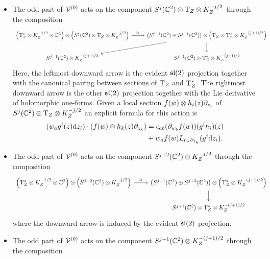 \begin{itemize}
\item The odd part of $\mathcal{V}^{(0)}$ acts on the component $S^{j}(\mathbb{C}^2) \otimes {\mathrm{T}}_Z \otimes K^{-j/2}_Z$ through the composition
\begin{equation}
\begin{tikzcd}
\left(\T^*_Z \otimes K^{-1/2}_Z \otimes \C^2\right) \otimes \left(S^{j}(\C^2) \otimes \T_Z \otimes K^{-j/2}_Z\right) \ar[r,"\cong"] & \left(S^{j-1}(\C^2) \oplus S^{j+1}(\C^2)\right) \otimes \left(\T_Z \otimes \T^*_Z \otimes K^{-(j+1)/2}_Z\right) \ar[dl] \ar[d] \\
S^{j-1}(\C^2) \otimes K^{-(j+1)/2}_Z & S^{j+1}(\C^2) \otimes \T^*_Z \otimes K^{-(j+1)/2}_Z 
\end{tikzcd}
\end{equation}
Here, the leftmost downward arrow is the evident $\mathfrak{sl}(2)$ projection together with the canonical pairing between sections of ${\mathrm{T}}_Z$ and ${\mathrm{T}}^*_Z$.
The rightmost downward arrow is the other $\mathfrak{sl}(2)$ projection together with the Lie derivative of holomorphic one-forms.  
Given a local section $f(w) \otimes h_i(z) \partial_{z_i}$ of $S^j(\mathbb{C}^2) \otimes {\mathrm{T}}_Z \otimes K_Z^{-j/2}$ an explicit formula for this action is
\begin{align*}
(w_a g^i(z) \mathrm{d} z_i) \cdot (f(w) \otimes h_k(z) \partial_{z_k}) & = \epsilon_{ab} (\partial_{w_b} f(w)) (g^i h_i)(z)  \\ & + w_a f(w) L_{h_k \partial_{z_k}} (g^i \mathrm{d} z_i) .
\end{align*}
\item The odd part of $\mathcal{V}^{(0)}$ acts on the component $S^{j+2}(\mathbb{C}^2) \otimes K^{-j/2}_Z$ through the composition
\begin{equation}
\begin{tikzcd}
\left(\T^*_Z \otimes K^{-1/2}_Z \otimes \C^2\right) \otimes \left(S^{j+2}(\C^2) \otimes K^{-j/2}_Z\right) \ar[r,"\cong"] & \left(S^{j+1}(\C^2) \oplus S^{j+3}(\C^2)\right) \otimes \left(\T^*_Z \otimes K^{-(j+1)/2}_Z\right) \ar[d] \\
& S^{j+1}(\C^2) \otimes \T^*_Z \otimes K^{-(j+1)/2}_Z
\end{tikzcd}
\end{equation}
where the downward arrow is induced by the evident $\mathfrak{sl}(2)$ projection.
\item The odd part of $\mathcal{V}^{(0)}$ acts on the component $S^{j-1}(\mathbb{C}^2) \otimes K^{-(j+1)/2}_Z$ through the composition
\begin{equation}
\begin{tikzcd}

\end{tikzcd}
\end{equation}
\end{itemize}
